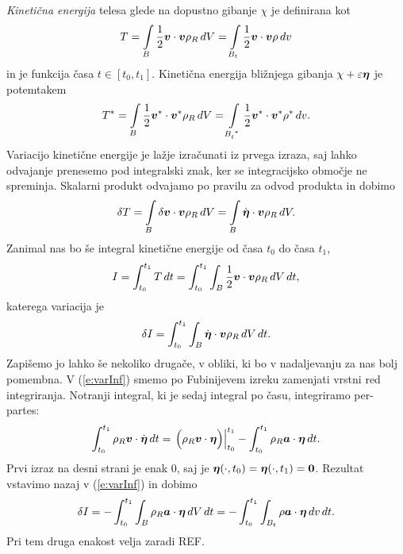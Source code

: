 \emph{Kinetična energija} telesa glede na dopustno gibanje $\chi$ je definirana kot
\begin{equation*}
	T = \int\limits_{B}\frac{1}{2}\boldsymbol v\cdot\boldsymbol v\rho_R\, dV =
	\int\limits_{B_t}\frac{1}{2}\boldsymbol v\cdot\boldsymbol v\rho\, dv
\end{equation*}
in je funkcija časa $t\in[t_0,t_1]$. Kinetična energija bližnjega gibanja $\chi+\varepsilon\boldsymbol \eta$
je potemtakem
\begin{equation*}
	T^* = \int\limits_{B}\frac{1}{2}\vek{v}^*\cdot\vek{v}^*\rho_R\, dV =
	\int\limits_{\bottop{B}{t}{*}}\frac{1}{2}\vek{v}^*\cdot\vek{v}^*\rho^*\, dv.
\end{equation*}
Variacijo kinetične energije je lažje izračunati iz prvega izraza, saj lahko odvajanje prenesemo pod
integralski znak, ker se integracijsko območje ne spreminja. Skalarni produkt odvajamo
po pravilu za odvod produkta in dobimo
\[
	\delta T =
	\int\limits_{B}\delta\boldsymbol v\cdot\boldsymbol v\rho_R\, dV=
	\int\limits_{B}\dot{\boldsymbol \eta}\cdot\boldsymbol v\rho_R\, dV.
\]
Zanimal nas bo še integral kinetične energije od časa $t_0$ do časa $t_1$,
\[ I=\int_{t_0}^{t_1} T\,dt=\int_{t_0}^{t_1} \int_{B}\frac{1}{2}\boldsymbol v\cdot\boldsymbol v\rho_R\, dV \,dt, \]
katerega variacija je
\begin{equation}\label{e:varInf}
	\delta I=\int_{t_0}^{t_1}\int_{B}\dot{\boldsymbol \eta}\cdot\boldsymbol v\rho_R\, dV\, dt.
\end{equation}
Zapišemo jo lahko še nekoliko drugače, v obliki, ki bo v nadaljevanju za nas bolj pomembna.
V (\ref{e:varInf}) smemo po Fubinijevem izreku zamenjati vrstni red integriranja.
Notranji integral, ki je sedaj integral po času, integriramo per-partes:
\[
	\int_{t_0}^{t_1}\rho_R\boldsymbol v\cdot\dot{\boldsymbol \eta}\, dt =
	\left.\Big(\rho_R\boldsymbol v\cdot\boldsymbol \eta\Big)\right|_{t_0}^{t_1}-
	\int_{t_0}^{t_1}\rho_R\boldsymbol a\cdot\boldsymbol \eta\,dt.
\]
Prvi izraz na desni strani je enak 0, saj je $\boldsymbol \eta(\cdot,t_0)=\boldsymbol \eta(\cdot,t_1)=\boldsymbol 0$.
Rezultat vstavimo nazaj v (\ref{e:varInf}) in dobimo
\begin{equation*}
	\delta I =
	-\int_{t_0}^{t_1}\int_{B}\rho_R\boldsymbol a\cdot\boldsymbol \eta\, dV\, dt=
	-\int_{t_0}^{t_1}\int_{B_t}\rho\boldsymbol a\cdot\boldsymbol \eta\, dv\, dt.
\end{equation*}
Pri tem druga enakost velja zaradi REF.

